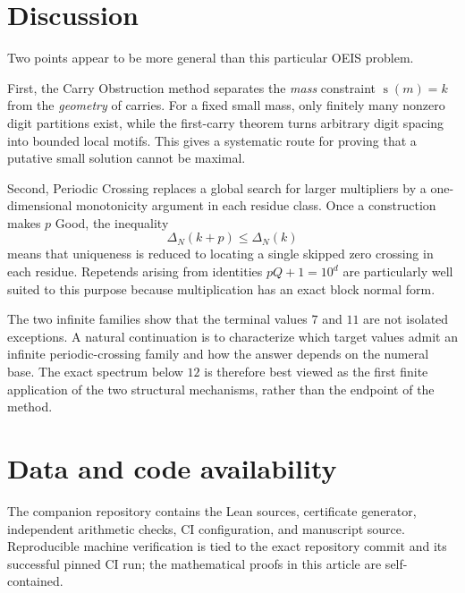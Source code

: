 \documentclass[11pt]{article}
\newcommand{\ds}{\operatorname{s}}
\newcommand{\Def}{\Delta}
\begin{document}
\section{Discussion}
Two points appear to be more general than this particular OEIS problem.

First, the Carry Obstruction method separates the \emph{mass} constraint $\ds(m)=k$ from the \emph{geometry} of carries.  For a fixed small mass, only finitely many nonzero digit partitions exist, while the first-carry theorem turns arbitrary digit spacing into bounded local motifs.  This gives a systematic route for proving that a putative small solution cannot be maximal.

Second, Periodic Crossing replaces a global search for larger multipliers by a one-dimensional monotonicity argument in each residue class.  Once a construction makes $p$ Good, the inequality
\[
 \Def_N(k+p)\le\Def_N(k)
\]
means that uniqueness is reduced to locating a single skipped zero crossing in each residue.  Repetends arising from identities $pQ+1=10^d$ are particularly well suited to this purpose because multiplication has an exact block normal form.

The two infinite families show that the terminal values $7$ and $11$ are not isolated exceptions.  A natural continuation is to characterize which target values admit an infinite periodic-crossing family and how the answer depends on the numeral base.  The exact spectrum below $12$ is therefore best viewed as the first finite application of the two structural mechanisms, rather than the endpoint of the method.

\section*{Data and code availability}
The companion repository contains the Lean sources, certificate generator, independent arithmetic checks, CI configuration, and manuscript source.  Reproducible machine verification is tied to the exact repository commit and its successful pinned CI run; the mathematical proofs in this article are self-contained.
\end{document}
